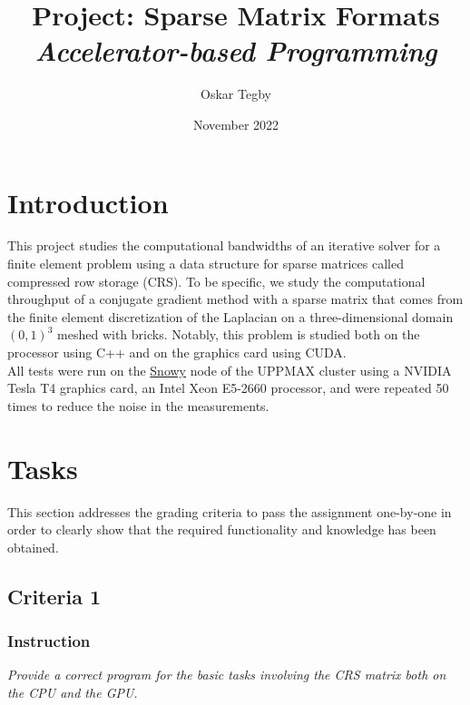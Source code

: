 \documentclass[10pt]{article}
\title{Project: Sparse Matrix Formats \\ \large \textit{Accelerator-based Programming}}
\author{Oskar Tegby}
\date{November 2022}
\begin{document}
\maketitle


\section{Introduction}
This project studies the computational bandwidths of an iterative solver for a finite element problem using a data structure for sparse matrices called compressed row storage (CRS). To be specific, we study the computational throughput of a conjugate gradient method with a sparse matrix that comes from the finite element discretization of the Laplacian on a three-dimensional domain $(0,1)^3$ meshed with bricks. Notably, this problem is studied both on the processor using C++ and on the graphics card using CUDA. \\

All tests were run on the \href{https://www.uppmax.uu.se/resources/systems/the-snowy-cluster/}{Snowy} node of the UPPMAX cluster using a NVIDIA Tesla T4 graphics card, an Intel Xeon E5-2660 processor, and were repeated 50 times to reduce the noise in the measurements.

\section{Tasks}
This section addresses the grading criteria to pass the assignment one-by-one in order to clearly show that the required functionality and knowledge has been obtained.
\subsection{Criteria 1}
\subsubsection{Instruction}
\textit{Provide a correct program for the basic tasks involving the CRS matrix both on the CPU and the GPU.}
\end{document}
